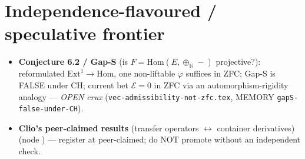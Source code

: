 \documentclass[11pt]{article}
\begin{document}
\section{Independence-flavoured / speculative frontier}
\begin{itemize}[leftmargin=1.4em]
\item \textbf{Conjecture 6.2 / Gap-S} (is $F=\mathrm{Hom}(E,\oplus_ℕ-)$ projective?): reformulated
$\mathrm{Ext}^1\to\mathrm{Hom}$, one non-liftable $\varphi$ suffices in ZFC; Gap-S is FALSE under CH;
current bet $ℰ=0$ in ZFC via an automorphism-rigidity analogy --- \emph{OPEN crux}
(\texttt{vec-admissibility-not-zfc.tex}, MEMORY \texttt{gapS-false-under-CH}).
\item \textbf{Clio's peer-claimed results} (transfer operators $\leftrightarrow$ container
derivatives)  (node ) --- register at peer-claimed; do
NOT promote without an independent check.
\end{itemize}
\end{document}
